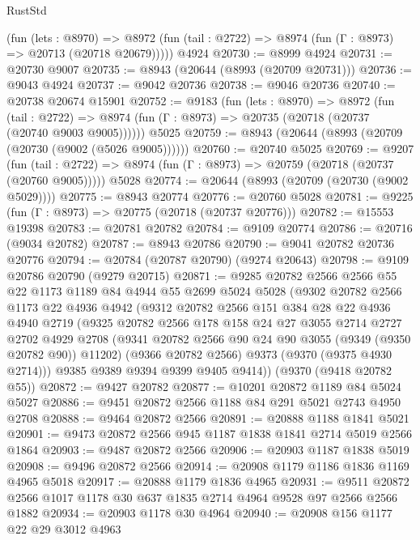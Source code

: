 \begin{lexlean}{RustStd}
\begin{coremodule}
{\begin{coremodule}
{{{{{{{{{{{{{{{{{{{{{{{{{{{{{{{{{{{{{{{      (fun (lets : @8970) =>
      @8972 (fun (tail : @2722) => @8974 (fun (Γ : @8973) => @20713 (@20718 @20679)))))
    @4924
@20730 := @8999 @4924
@20731 := @20730 @9007
@20735 := @8943 (@20644 (@8993 (@20709 @20731)))
@20736 := @9043 @4924
@20737 := @9042 @20736
@20738 := @9046 @20736
@20740 := @20738 @20674 @15901
@20752 := @9183
    (fun (lets : @8970) =>
    @8972
      (fun (tail : @2722) =>
      @8974 (fun (Γ : @8973) => @20735 (@20718 (@20737 (@20740 @9003 @9005))))))
    @5025
@20759 := @8943 (@20644 (@8993 (@20709 (@20730 (@9002 (@5026 @9005))))))
@20760 := @20740 @5025
@20769 := @9207
    (fun (tail : @2722) => @8974 (fun (Γ : @8973) => @20759 (@20718 (@20737 (@20760 @9005)))))
    @5028
@20774 := @20644 (@8993 (@20709 (@20730 (@9002 @5029))))
@20775 := @8943 @20774
@20776 := @20760 @5028
@20781 := @9225 (fun (Γ : @8973) => @20775 (@20718 (@20737 @20776)))
@20782 := @15553 @19398
@20783 := @20781 @20782
@20784 := @9109 @20774
@20786 := @20716 (@9034 @20782)
@20787 := @8943 @20786
@20790 := @9041 @20782 @20736 @20776
@20794 := @20784 (@20787 @20790) (@9274 @20643)
@20798 := @9109 @20786 @20790 (@9279 @20715)
@20871 := @9285
    @20782
    @2566
    @2566
    @55
    @22
    @1173
    @1189
    @84
    @4944
    @55
    @2699
    @5024
    @5028
    (@9302
      @20782
      @2566
      @1173
      @22
      @4936
      @4942
      (@9312
        @20782
        @2566
        @151
        @384
        @28
        @22
        @4936
        @4940
        @2719
        (@9325
          @20782
          @2566
          @178
          @158
          @24
          @27
          @3055
          @2714
          @2727
          @2702
          @4929
          @2708
          (@9341 @20782 @2566 @90 @24 @90 @3055 (@9349 (@9350 @20782 @90)) @11202)
          (@9366 @20782 @2566)
          @9373
          (@9370 (@9375 @4930 @2714)))
        @9385
        @9389
        @9394
        @9399
        @9405
        @9414))
    (@9370 (@9418 @20782 @55))
@20872 := @9427 @20782
@20877 := @10201 @20872 @1189 @84 @5024 @5027
@20886 := @9451 @20872 @2566 @1188 @84 @291 @5021 @2743 @4950 @2708
@20888 := @9464 @20872 @2566
@20891 := @20888 @1188 @1841 @5021
@20901 := @9473 @20872 @2566 @945 @1187 @1838 @1841 @2714 @5019 @2566 @1864
@20903 := @9487 @20872 @2566
@20906 := @20903 @1187 @1838 @5019
@20908 := @9496 @20872 @2566
@20914 := @20908 @1179 @1186 @1836 @1169 @4965 @5018
@20917 := @20888 @1179 @1836 @4965
@20931 := @9511 @20872 @2566 @1017 @1178 @30 @637 @1835 @2714 @4964 @9528 @97 @2566 @2566 @1882
@20934 := @20903 @1178 @30 @4964
@20940 := @20908 @156 @1177 @22 @29 @3012 @4963
}}}}}}}}}}}}}}}}}}}}}}}}}}}}}}}}}}}}}}}
\end{coremodule}}
\end{coremodule}
\end{lexlean}
